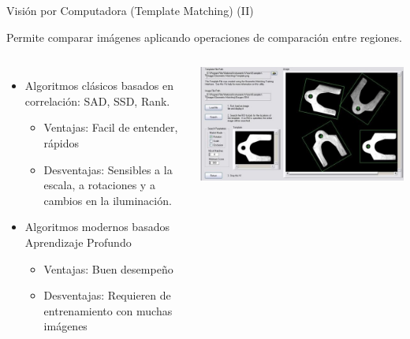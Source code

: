\begin{frame}{Visión por Computadora (Template Matching) (II)}

Permite comparar imágenes aplicando operaciones de comparación entre regiones.
\begin{columns}
  \begin{itemize}
    \item Algoritmos clásicos basados en correlación: SAD, SSD, Rank.
	  \begin{itemize}
		    \item Ventajas: Facil de entender, rápidos
		    \item Desventajas: Sensibles a la escala, a rotaciones y a cambios en la iluminación. 
	  \end{itemize}
    \item Algoritmos modernos basados Aprendizaje Profundo
		\begin{itemize}
		    \item Ventajas: Buen desempeño 
		    \item Desventajas: Requieren de entrenamiento con muchas imágenes
	  \end{itemize}

  \end{itemize}
        \begin{center}
            \includegraphics[width=\textwidth]{00_IntroComputerVision/figs/Industrial-software-example-for-Template-Matching_W640}\\
     \end{center}

    \end{columns}
\end{frame}


